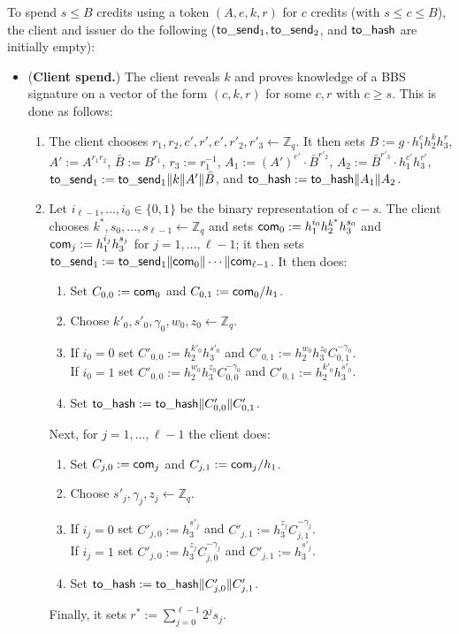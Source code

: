 \documentclass[11pt]{article}
\def\com{{\sf com}}
\def\send{{\sf to}\mbox{\_}{\sf send}}
\def\hash{{\sf to}\mbox{\_}{\sf hash}}
\def\Z{{\mathbb Z}}
\def\bool{\{0,1\}}
\def\Z{{\mathbb Z}}
\begin{document}
\medskip{}
To spend $s\leq B$ credits using a token $(A, e, k, r)$ for $c$ credits (with $s \leq c\leq B$), the client and issuer do the following ($\send_1, \send_2$, and $\hash$ are initially empty):
\begin{itemize}
    \item ({\bf Client spend.}) The client reveals $k$ and proves knowledge of a BBS signature on a vector of the form $(c, k, r)$ for some $c, r$ with $c \geq s$. This is done as follows:
    \begin{enumerate}
        \item The client chooses $r_1, r_2, c', r', e', r'_2, r'_3 \leftarrow \Z_q$. It then sets $B:= g \cdot h_1^c h_2^k h_3^r$, $A':=A^{r_1 r_2}$, $\bar B:=B^{r_1}$, $r_3 := r_1^{-1}$,
 $A_1:=(A')^{e'} \cdot \bar B^{r'_2}$, $A_2:= \bar B^{r'_3} \cdot h_1^{c'} h_3^{r'}$, $\send_1:=\send_1\|k\|A'\|\bar B$, and $\hash:=\hash\|A_1\|A_2$.
 
 \item Let $i_{\ell-1}, \ldots, i_0 \in \bool$ be the binary representation of $c-s$. %
The client chooses $k^*, s_0, \ldots, s_{\ell-1} \leftarrow \Z_q$ and sets
$\com_0:=h_1^{i_0} h_2^{k^*} h_3^{s_0}$ and
$\com_j:=h_1^{i_j} h_3^{s_j}$ for $j=1, \ldots, \ell-1$; it then sets $\send_1:=\send_1\|\com_0\|\cdots \|\com_{\ell-1}$.
It then does:
\begin{enumerate}
        \item Set $C_{0,0}:=\com_0$ and $C_{0,1} :=\com_0/h_1$.     
        \item Choose $k'_0, s'_0, \gamma_0, w_0, z_0 \leftarrow \Z_q$.
        \item If $i_0=0$ set $C'_{0,0} := h_2^{k'_0} h_3^{s'_0}$ and $C'_{0,1}:= h_2^{w_0} h_3^{z_0} C_{0,1}^{-\gamma_0}$.\\
              If $i_0=1$ set $C'_{0,0} := h_2^{w_0} h_3^{z_0} C_{0,0}^{-\gamma_0}$ and $C'_{0,1}:= h_2^{k'_0} h_3^{s'_0}$.
        \item Set $\hash:=\hash\|C'_{0,0} \| C'_{0,1}$.
        \end{enumerate}
Next, for $j=1, \ldots, \ell-1$ the client does: \begin{enumerate}
        \item Set $C_{j,0}:=\com_j$ and $C_{j,1} :=\com_j/h_1$.     
        \item Choose $s'_j, \gamma_j, z_j \leftarrow \Z_q$.
        \item If $i_j=0$ set $C'_{j,0} := h_3^{s'_j}$ and $C'_{j,1}:=h_3^{z_j} C_{j,1}^{-\gamma_j}$.\\
              If $i_j=1$ set $C'_{j,0} := h_3^{z_j} C_{j,0}^{-\gamma_j}$ and $C'_{j,1}:=h_3^{s'_j}$.
        \item Set $\hash:=\hash\|C'_{j,0} \| C'_{j,1}$.
        \end{enumerate}
        Finally, it sets  
        $r^* := \sum_{j=0}^{\ell-1} 2^j s_j$.
        

\end{enumerate}
\end{itemize}
\end{document}
